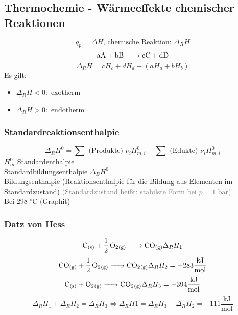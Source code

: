\documentclass[a4paper, fleqn]{article}
\begin{document}
\subsection{Thermochemie - Wärmeeffekte chemischer Reaktionen}
\begin{equation*}
    q_p = \Delta H,\, \text{chemische Reaktion: } \Delta_R H
\end{equation*}
\begin{equation*}
    \ce{aA + bB -> cC + dD}
\end{equation*}
\begin{equation*}
    \Delta_R H = cH_c + dH_d - (aH_a + bH_b)
\end{equation*}
Es gilt:
\begin{itemize}
    \item[] $\Delta_R H < 0 :$ exotherm
    \item[] $\Delta_R H > 0 :$ endotherm 
\end{itemize}

\subsubsection{Standardreaktionsenthalpie}
\begin{equation*}
    \Delta_RH^0 = \sum\text{ (Produkte) }\nu_i H_{m,i}^0 - \sum\text{ (Edukte) } \nu_i H_{m,i}^0
\end{equation*}
$H_m^0$ Standardenthalpie\\
Standardbildungsenthalpie $\Delta_BH^0$\\
Bildungsenthalpie (Reaktionsenthalpie für die Bildung aus Elementen im Standardzustand) \textcolor{gray}{(Standardzustand heißt: stabilste Form bei $p=1$ bar)}\\
Bei 298 $^\circ$C  (Graphit)

\subsubsection{Datz von Hess}
\begin{equation*}
    \ce{C_{(s)} + 1/2 O2_{(g)} -> CO_{(g)}} \Delta_R H_1
\end{equation*}
\begin{equation*}
    \ce{CO_{(g)} + 1/2 O2_{(g)} -> CO2_{(g)}} \Delta_R H_2 = -283 \mathrm{\frac{kJ}{mol}}
\end{equation*}
\begin{equation*}
    \ce{C_{(s)} + O2_{(g)} -> CO2_{(g)}} \Delta_R H_3 = -394 \mathrm{\frac{kJ}{mol}}
\end{equation*}
\begin{equation*}
    \Delta_RH_1 + \Delta_RH_2 = \Delta_RH_3 \Leftrightarrow \Delta_RH1 = \Delta_RH_3 - \Delta_RH_2 = -111 \mathrm{\frac{kJ}{mol}}
\end{equation*}
\end{document}
